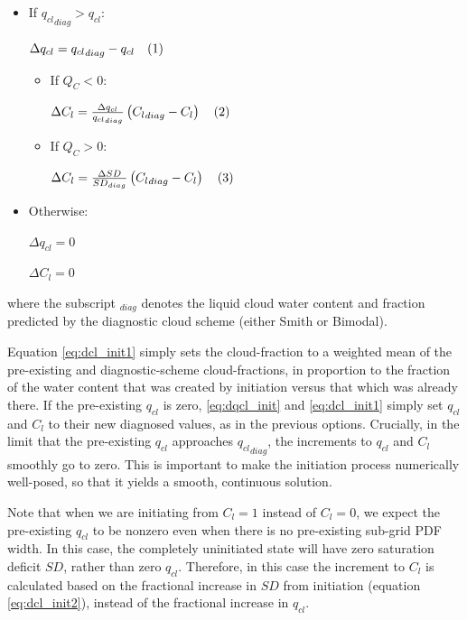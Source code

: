 \documentclass{UMDP_article}
\begin{document}
\begin{itemize}

\item If ${q_{cl}}_{diag} > q_{cl}$:

$\Delta q_{cl} = {q_{cl}}_{diag} - q_{cl}
\quad \refstepcounter{equation}(\theequation)\label{eq:dqcl_init}$


  \begin{itemize}

  \item If $Q_C < 0$:

  $\Delta C_{l} = \frac{\Delta q_{cl}}{{q_{cl}}_{diag}}
                \left( {C_{l}}_{diag} - C_{l} \right)
  \quad \refstepcounter{equation}(\theequation)\label{eq:dcl_init1}$

  \item If $Q_C > 0$:

  $\Delta C_{l} = \frac{\Delta SD}{{SD}_{diag}}
                \left( {C_{l}}_{diag} - C_{l} \right)
  \quad \refstepcounter{equation}(\theequation)\label{eq:dcl_init2}$

  \end{itemize}

\item Otherwise:

$\Delta q_{cl} = 0$

$\Delta C_{l} = 0$

\end{itemize}

where the subscript $_{diag}$ denotes the liquid cloud water content and
fraction predicted by the diagnostic cloud scheme (either Smith or Bimodal).

Equation \ref{eq:dcl_init1} simply sets the cloud-fraction to a weighted
mean of the pre-existing and diagnostic-scheme cloud-fractions, in proportion
to the fraction of the water content that was created by initiation
versus that which was already there.
If the pre-existing $q_{cl}$ is zero, \ref{eq:dqcl_init} and \ref{eq:dcl_init1}
simply set $q_{cl}$ and $C_l$ to their new diagnosed values,
as in the previous options.
Crucially, in the limit that the pre-existing $q_{cl}$ approaches
${q_{cl}}_{diag}$, the increments to $q_{cl}$ and $C_l$ smoothly go to zero.
This is important to make the initiation process numerically well-posed,
so that it yields a smooth, continuous solution.

Note that when we are initiating from $C_l = 1$ instead of $C_l = 0$,
we expect the pre-existing $q_{cl}$ to be nonzero even when there is
no pre-existing sub-grid PDF width.  In this case, the completely
uninitiated state will have zero saturation deficit $SD$, rather than
zero $q_{cl}$.  Therefore, in this case the increment to $C_l$ is calculated
based on the fractional increase in $SD$ from initiation
(equation \ref{eq:dcl_init2}), instead of the fractional increase in $q_{cl}$.
\end{document}
